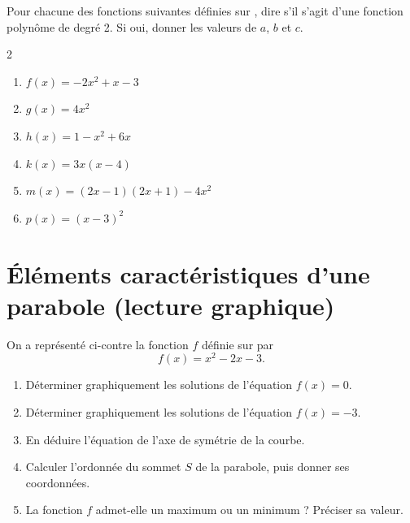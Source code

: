\documentclass[11pt,a4paper]{book}
\begin{document}
\exerciceDS{}

Pour chacune des fonctions suivantes définies sur \R, dire s'il s'agit d'une fonction polynôme de degré 2. Si oui, donner les valeurs de $a$, $b$ et $c$.

\begin{multicols}{2}
	\begin{enumerate}[label=\textbf{\alph*)}]
		\item $f(x)=-2x^2+x-3$
		\item $g(x)=4x^2$
		\item $h(x)=1-x^2+6x$
		\item $k(x)=3x(x-4)$
		\item $m(x)=(2x-1)(2x+1)-4x^2$
		\item $p(x)=(x-3)^2$
	\end{enumerate}
\end{multicols}

\section*{\color{green!55!black}Éléments caractéristiques d'une parabole (lecture graphique)}

\exerciceDS{}

\begin{minipage}[c]{0.5\linewidth}
	On a représenté ci-contre la fonction $f$ définie sur \R par
	$$f(x)=x^2-2x-3.$$
	\begin{enumerate}[label=\textbf{\arabic*)}]
		\item Déterminer graphiquement les solutions de l'équation $f(x)=0$.
		\item Déterminer graphiquement les solutions de l'équation $f(x)=-3$.
		\item En déduire l'équation de l'axe de symétrie de la courbe.
		\item Calculer l'ordonnée du sommet $S$ de la parabole, puis donner ses coordonnées.
		\item La fonction $f$ admet-elle un maximum ou un minimum ? Préciser sa valeur.
	\end{enumerate}
\end{minipage} \hfill
\begin{minipage}[c]{0.46\linewidth}
	\begin{center}
	\end{center}
\end{minipage}
\end{document}
